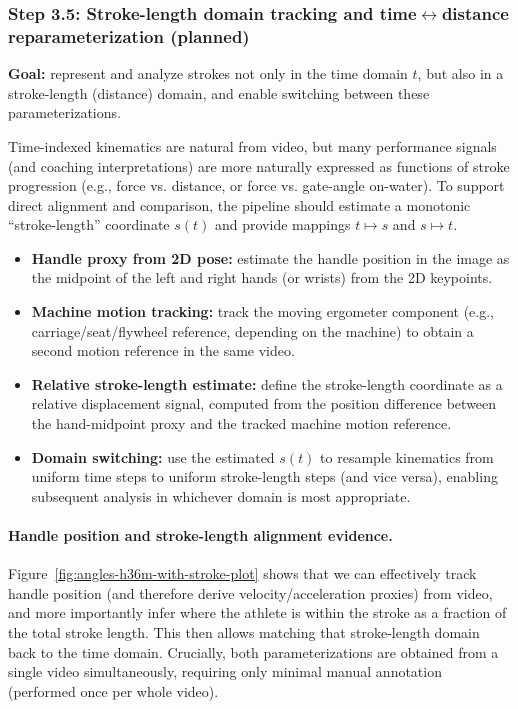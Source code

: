 \documentclass[11pt]{article}
\begin{document}
\subsubsection*{Step 3.5: Stroke-length domain tracking and time$\leftrightarrow$distance reparameterization (planned)}
\textbf{Goal:} represent and analyze strokes not only in the time domain $t$, but also in a stroke-length (distance) domain, and enable switching between these parameterizations.

Time-indexed kinematics are natural from video, but many performance signals (and coaching interpretations) are more naturally expressed as functions of stroke progression (e.g., force vs. distance, or force vs. gate-angle on-water). To support direct alignment and comparison, the pipeline should estimate a monotonic ``stroke-length'' coordinate $s(t)$ and provide mappings $t \mapsto s$ and $s \mapsto t$.

\begin{itemize}
	\item \textbf{Handle proxy from 2D pose:} estimate the handle position in the image as the midpoint of the left and right hands (or wrists) from the 2D keypoints.
	\item \textbf{Machine motion tracking:} track the moving ergometer component (e.g., carriage/seat/flywheel reference, depending on the machine) to obtain a second motion reference in the same video.
	\item \textbf{Relative stroke-length estimate:} define the stroke-length coordinate as a relative displacement signal, computed from the position difference between the hand-midpoint proxy and the tracked machine motion reference.
	\item \textbf{Domain switching:} use the estimated $s(t)$ to resample kinematics from uniform time steps to uniform stroke-length steps (and vice versa), enabling subsequent analysis in whichever domain is most appropriate.
\end{itemize}

\paragraph{Handle position and stroke-length alignment evidence.}
Figure~\ref{fig:angles-h36m-with-stroke-plot} shows that we can effectively track handle position (and therefore derive velocity/acceleration proxies) from video, and more importantly infer where the athlete is within the stroke as a fraction of the total stroke length. This then allows matching that stroke-length domain back to the time domain. Crucially, both parameterizations are obtained from a single video simultaneously, requiring only minimal manual annotation (performed once per whole video).
\end{document}
